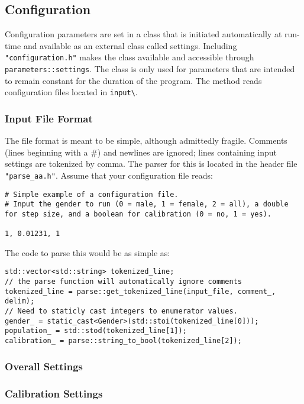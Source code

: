 \documentclass{article}
\begin{document}
\subsection{Configuration}
Configuration parameters are set in a class that is initiated automatically at run-time and available as an external class called settings. Including \verb|"configuration.h"| makes the class available and accessible through \verb|parameters::settings|. The class is only used for parameters that are intended to remain constant for the duration of the program. The method reads configuration files located in \verb|input\|.

\subsubsection{Input File Format}
The file format is meant to be simple, although admittedly fragile. Comments (lines beginning with a \#) and newlines are ignored; lines containing input settings are tokenized by comma. The parser for this is located in the header file \verb|"parse_aa.h"|. Assume that your configuration file reads:
\begin{verbatim}
# Simple example of a configuration file.
# Input the gender to run (0 = male, 1 = female, 2 = all), a double for step size, and a boolean for calibration (0 = no, 1 = yes).

1, 0.01231, 1
\end{verbatim}
The code to parse this would be as simple as:
\begin{verbatim}
std::vector<std::string> tokenized_line;
// the parse function will automatically ignore comments
tokenized_line = parse::get_tokenized_line(input_file, comment_, delim);
// Need to staticly cast integers to enumerator values.
gender_ = static_cast<Gender>(std::stoi(tokenized_line[0]));
population_ = std::stod(tokenized_line[1]);
calibration_ = parse::string_to_bool(tokenized_line[2]);
\end{verbatim}
\subsubsection{Overall Settings}
\subsubsection{Calibration Settings}
\end{document}
